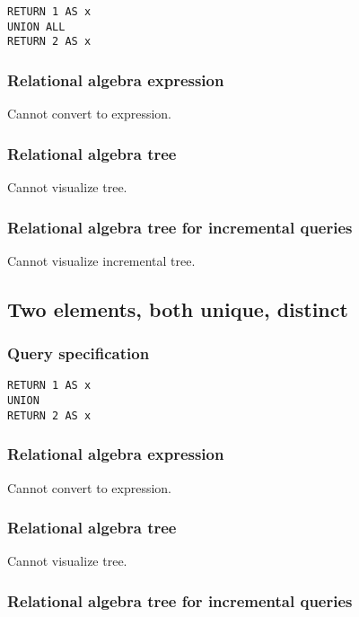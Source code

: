 \begin{lstlisting}
RETURN 1 AS x
UNION ALL
RETURN 2 AS x
\end{lstlisting}

\subsubsection*{Relational algebra expression}

Cannot convert to expression.

\subsubsection*{Relational algebra tree}

Cannot visualize tree.

\subsubsection*{Relational algebra tree for incremental queries}

Cannot visualize incremental tree.

\subsection{Two elements, both unique, distinct}

\subsubsection*{Query specification}

\begin{lstlisting}
RETURN 1 AS x
UNION
RETURN 2 AS x
\end{lstlisting}

\subsubsection*{Relational algebra expression}

Cannot convert to expression.

\subsubsection*{Relational algebra tree}

Cannot visualize tree.

\subsubsection*{Relational algebra tree for incremental queries}


